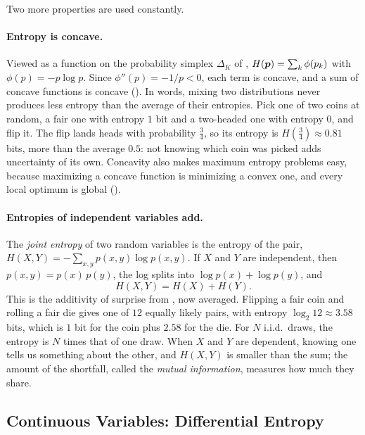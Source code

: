 Two more properties are used constantly.

\paragraph{Entropy is concave.}
Viewed as a function on the probability simplex $\Delta_K$ of
, $H(\bm{p}) = \sum_k \phi(p_k)$ with
$\phi(p) = -p \log p$. Since $\phi''(p) = -1/p < 0$, each term is concave,
and a sum of concave functions is concave (). In words,
mixing two distributions never produces less entropy than the average of
their entropies. Pick one of two coins at random, a fair one with
entropy $1$ bit and a two-headed one with entropy $0$, and flip it. The
flip lands heads with probability $\tfrac34$, so its entropy is
$H(\tfrac34) \approx 0.81$ bits, more than the average $0.5$: not knowing
which coin was picked adds uncertainty of its own.
Concavity also makes maximum entropy problems easy, because maximizing a
concave function is minimizing a convex one, and every local optimum is
global ().

\paragraph{Entropies of independent variables add.}
The \emph{joint entropy} of two random variables is the entropy of the
pair, $H(X, Y) = -\sum_{x, y} p(x, y) \log p(x, y)$. If $X$ and $Y$ are
independent, then $p(x, y) = p(x)\,p(y)$, the log splits into $\log p(x) +
\log p(y)$, and
\[
  H(X, Y) = H(X) + H(Y) .
\]
This is the additivity of surprise from , now
averaged. Flipping a fair coin and rolling a fair die gives one of $12$
equally likely pairs, with entropy $\log_2 12 \approx 3.58$ bits, which is
$1$ bit for the coin plus $2.58$ for the die. For $N$ i.i.d.\ draws, the
entropy is $N$ times that of one draw. When $X$ and $Y$ are dependent,
knowing one tells us something about the other, and $H(X, Y)$ is smaller
than the sum; the amount of the shortfall, called the \emph{mutual
information}, measures how much they share.

\subsection{Continuous Variables: Differential Entropy}
\label{sec:ch07-differential}

